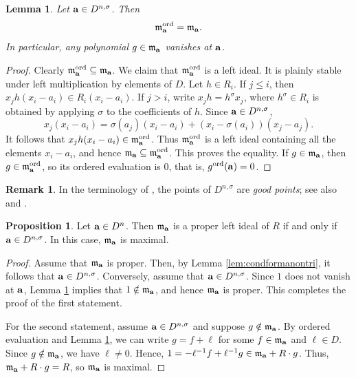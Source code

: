 \documentclass[11pt,reqno]{amsart}
\newtheorem{lem}[thm]{Lemma}
\theoremstyle{definition}
\newtheorem{prop}[thm]{Proposition}
\newtheorem{rmk}[thm]{Remark}
\begin{document}
\begin{lem}\label{lem:annulfcn} Let ${\bf a} \in D^{n,\sigma}$. Then
\[
\mathfrak{m}_{{\bf a}}^{\rm ord}=\mathfrak{m}_{{\bf a}}.
\]
In particular, any polynomial $g \in \mathfrak{m}_{{\bf a}}$ vanishes at ${\bf a}$.
\end{lem}
\begin{proof}
Clearly $\mathfrak{m}_{{\bf a}}^{\rm ord}\subseteq\mathfrak{m}_{{\bf a}}$. We claim that $\mathfrak{m}_{{\bf a}}^{\rm ord}$ is a left ideal. It is plainly stable under left multiplication by elements of $D$. Let $h\in R_i$. If $j\leq i$, then $x_jh(x_i-a_i)\in R_i(x_i-a_i)$. If $j>i$, write $x_jh=h^\sigma x_j$, where $h^\sigma\in R_i$ is obtained by applying $\sigma$ to the coefficients of $h$. Since ${\bf a}\in D^{n,\sigma}$,
\begin{equation}\label{eq:goodpointidentity}
x_j(x_i-a_i)=\sigma(a_j)(x_i-a_i)+(x_i-\sigma(a_i))(x_j-a_j).
\end{equation}
It follows that $x_jh(x_i-a_i)\in\mathfrak{m}_{{\bf a}}^{\rm ord}$. Thus $\mathfrak{m}_{{\bf a}}^{\rm ord}$ is a left ideal containing all the elements $x_i-a_i$, and hence $\mathfrak{m}_{{\bf a}}\subseteq\mathfrak{m}_{{\bf a}}^{\rm ord}$. This proves the equality. If $g\in\mathfrak{m}_{{\bf a}}$, then $g\in\mathfrak{m}_{{\bf a}}^{\rm ord}$, so its ordered evaluation is $0$, that is, $g^{\rm{ord}}({\bf a})=0$.
\end{proof}

\begin{rmk}
In the terminology of \cite[Definition~7.6]{LM25}, the points of $D^{n,\sigma}$ are \emph{good points}; see also \cite[Theorem~7.7]{LM25} and \cite[Theorem~3.9]{LN25}.
\end{rmk}

\begin{prop}\label{prop:maproper}
Let ${\bf a} \in D^n$. Then $\mathfrak{m}_{{\bf a}}$ is a proper left ideal of $R$ if and only if ${\bf a} \in D^{n,\sigma}$. In this case, $\mathfrak{m}_{{\bf a}}$ is maximal. 
\end{prop}
\begin{proof} Assume that ${\mathfrak{m}}_{{\bf a}}$ is proper. Then, by Lemma \ref{lem:condformanontri}, it follows that ${\bf a} \in D^{n,\sigma}$. Conversely, assume that ${\bf a} \in D^{n,\sigma}$. Since $1$ does not vanish at ${\bf a}$, Lemma \ref{lem:annulfcn} implies that $1 \notin \mathfrak{m}_{{\bf a}}$, and hence $\mathfrak{m}_{{\bf a}}$ is proper. This completes the proof of the first statement. 

For the second statement, assume ${\bf a}\in D^{n,\sigma}$ and suppose $g \notin \mathfrak{m}_{{\bf a}}$. By ordered evaluation and Lemma \ref{lem:annulfcn}, we can write $g=f+\ell$ for some $f \in \mathfrak{m}_{{\bf a}}$ and $\ell \in D$. Since $g\notin\mathfrak{m}_{{\bf a}}$, we have $\ell\neq 0$. Hence, $1=-\ell^{-1}f + \ell^{-1}g \in \mathfrak{m}_{{\bf a}}+R \cdot g$. Thus, $\mathfrak{m}_{{\bf a}}+R \cdot g=R$, so $\mathfrak{m}_{{\bf a}}$ is maximal.
\end{proof}
\end{document}
